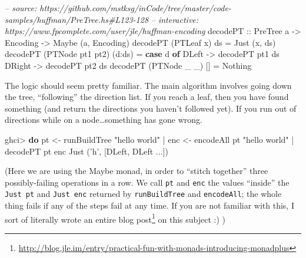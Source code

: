 \documentclass[]{article}
\newenvironment{Shaded}{}{}
\newcommand{\KeywordTok}[1]{\textcolor[rgb]{0.00,0.44,0.13}{\textbf{{#1}}}}
\newcommand{\DataTypeTok}[1]{\textcolor[rgb]{0.56,0.13,0.00}{{#1}}}
\newcommand{\CharTok}[1]{\textcolor[rgb]{0.25,0.44,0.63}{{#1}}}
\newcommand{\StringTok}[1]{\textcolor[rgb]{0.25,0.44,0.63}{{#1}}}
\newcommand{\CommentTok}[1]{\textcolor[rgb]{0.38,0.63,0.69}{\textit{{#1}}}}
\newcommand{\OtherTok}[1]{\textcolor[rgb]{0.00,0.44,0.13}{{#1}}}
\newcommand{\FunctionTok}[1]{\textcolor[rgb]{0.02,0.16,0.49}{{#1}}}
\newcommand{\NormalTok}[1]{{#1}}
\renewcommand{\href}[2]{#2\footnote{\url{#1}}}
\begin{document}
\begin{Shaded}
\begin{Highlighting}[]
\CommentTok{-- source: https://github.com/mstksg/inCode/tree/master/code-samples/huffman/PreTree.hs#L123-128}
\CommentTok{-- interactive: https://www.fpcomplete.com/user/jle/huffman-encoding}
\OtherTok{decodePT ::} \DataTypeTok{PreTree} \NormalTok{a }\OtherTok{->} \DataTypeTok{Encoding} \OtherTok{->} \DataTypeTok{Maybe} \NormalTok{(a, }\DataTypeTok{Encoding}\NormalTok{)}
\NormalTok{decodePT (}\DataTypeTok{PTLeaf} \NormalTok{x)       ds     }\FunctionTok{=} \DataTypeTok{Just} \NormalTok{(x, ds)}
\NormalTok{decodePT (}\DataTypeTok{PTNode} \NormalTok{pt1 pt2) (d}\FunctionTok{:}\NormalTok{ds) }\FunctionTok{=} \KeywordTok{case} \NormalTok{d }\KeywordTok{of}
                                     \DataTypeTok{DLeft}  \OtherTok{->} \NormalTok{decodePT pt1 ds}
                                     \DataTypeTok{DRight} \OtherTok{->} \NormalTok{decodePT pt2 ds}
\NormalTok{decodePT (}\DataTypeTok{PTNode} \NormalTok{_ _)     []     }\FunctionTok{=} \DataTypeTok{Nothing}
\end{Highlighting}
\end{Shaded}

The logic should seem pretty familiar. The main algorithm involves going
down the tree, ``following'' the direction list. If you reach a leaf,
then you have found something (and return the directions you haven't
followed yet). If you run out of directions while on a
node\ldots{}something has gone wrong.

\begin{Shaded}
\begin{Highlighting}[]
\NormalTok{ghci}\FunctionTok{>} \KeywordTok{do}  \NormalTok{pt  }\OtherTok{<-} \NormalTok{runBuildTree }\StringTok{"hello world"}
    \FunctionTok{|}     \NormalTok{enc }\OtherTok{<-} \NormalTok{encodeAll pt }\StringTok{"hello world"}
    \FunctionTok{|}     \NormalTok{decodePT pt enc}
\DataTypeTok{Just} \NormalTok{(}\CharTok{'h'}\NormalTok{, [}\DataTypeTok{DLeft}\NormalTok{, }\DataTypeTok{DLeft} \FunctionTok{...}\NormalTok{])}
\end{Highlighting}
\end{Shaded}

(Here we are using the Maybe monad, in order to ``stitch together''
three possibly-failing operations in a row. We call \texttt{pt} and
\texttt{enc} the values ``inside'' the \texttt{Just\ pt} and
\texttt{Just\ enc} returned by \texttt{runBuildTree} and
\texttt{encodeAll}; the whole thing fails if any of the steps fail at
any time. If you are not familiar with this,
\href{http://blog.jle.im/entry/practical-fun-with-monads-introducing-monadplus}{I
sort of literally wrote an entire blog post} on this subject :) )
\end{document}
